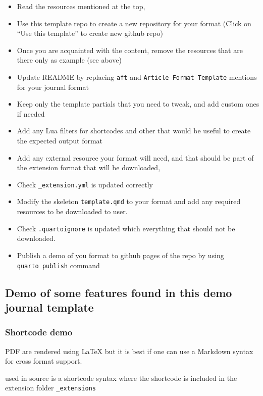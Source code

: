 \documentclass[fleqn,10pt]{wlscirep}
\providecommand{\tightlist}{%
  \setlength{\itemsep}{0pt}\setlength{\parskip}{0pt}}
\begin{document}
\begin{itemize}
\tightlist
\item
  Read the resources mentioned at the top,
\item
  Use this template repo to create a new repository for your format
  (Click on ``Use this template'' to create new github repo)
\item
  Once you are acquainted with the content, remove the resources that
  are there only as example (see above)
\item
  Update README by replacing \texttt{aft} and
  \texttt{Article\ Format\ Template} mentions for your journal format
\item
  Keep only the template partials that you need to tweak, and add custom
  ones if needed
\item
  Add any Lua filters for shortcodes and other that would be useful to
  create the expected output format
\item
  Add any external resource your format will need, and that should be
  part of the extension format that will be downloaded,
\item
  Check \texttt{\_extension.yml} is updated correctly
\item
  Modify the skeleton \texttt{template.qmd} to your format and add any
  required resources to be downloaded to user.
\item
  Check \texttt{.quartoignore} is updated which everything that should
  not be downloaded.
\item
  Publish a demo of you format to github pages of the repo by using
  \texttt{quarto\ publish} command
\end{itemize}

\hypertarget{demo-of-some-features-found-in-this-demo-journal-template}{%
\subsection{Demo of some features found in this demo journal
template}\label{demo-of-some-features-found-in-this-demo-journal-template}}

\hypertarget{sec-shortcode}{%
\subsubsection{Shortcode demo}\label{sec-shortcode}}

PDF are rendered using {\LaTeX} but it is best if one can use a Markdown
syntax for cross format support.

\texttt{} used in source is a shortcode syntax where the shortcode is
included in the extension folder \texttt{\_extensions}
\end{document}
